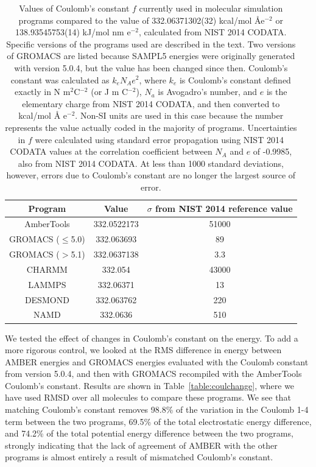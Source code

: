 \begin{table}
\caption{Values of Coulomb's constant $f$ currently used in molecular
  simulation programs compared to the value of 332.06371302(32)
  kcal/mol \AA e$^{-2}$ or 138.93545753(14) kJ/mol nm
  e$^{-2}$, calculated from NIST 2014 CODATA.  Specific versions of the programs
  used are described in the text. Two versions of GROMACS are listed
  because SAMPL5 energies were originally generated with version
  5.0.4, but the value has been changed since then. Coulomb's constant
  was calculated as $k_e N_A e^2$, where $k_e$ is Coulomb's constant
  defined exactly in N m$^2$C$^{-2}$ (or J m C$^{-2}$),
  $N_a$ is Avogadro's number, and $e$ is the elementary charge from
  NIST 2014 CODATA, and then converted to kcal/mol \AA
  e$^{-2}$. Non-SI units are used in this case because the number
  represents the value actually coded in the majority of programs.
  Uncertainties in $f$ were calculated using standard error
  propagation using NIST 2014 CODATA values at the correlation
  coefficient between $N_A$ and $e$ of -0.9985, also from NIST 2014
  CODATA. At less than 1000 standard deviations, however, errors due
  to Coulomb's constant are no longer the largest source of
  error.\label{tab:delfromnist}}
\begin{center}
\begin{tabular}{|ccc|}
\hline
Program & Value & $\sigma$ from NIST 2014 reference value \\
\hline
AmberTools &  332.0522173 & 51000 \\
GROMACS ($\leq$5.0) & 332.063693 & 89 \\
GROMACS ($>$5.1) & 332.0637138 & 3.3 \\ 
CHARMM & 332.054 & 43000 \\
LAMMPS & 332.06371 &  13 \\
DESMOND & 332.063762 & 220 \\
NAMD & 332.0636 & 510 \\
\hline
\end{tabular}
\end{center}
\end{table}

We tested the effect of changes in Coulomb's constant on the energy.
To add a more rigorous control, we looked at the RMS difference in
energy between AMBER energies and GROMACS energies evaluated with the
Coulomb constant from version 5.0.4, and then with GROMACS recompiled
with the AmberTools Coulomb's constant.  Results are shown in
Table~\ref{table:coulchange}, where we have used RMSD over all
molecules to compare these programs. We see that matching Coulomb's
constant removes 98.8\% of the variation in the Coulomb 1-4 term
between the two programs, 69.5\% of the total electrostatic energy
difference, and 74.2\% of the total potential energy difference
between the two programs, strongly indicating that the lack of
agreement of AMBER with the other programs is almost entirely a result
of mismatched Coulomb's constant.

